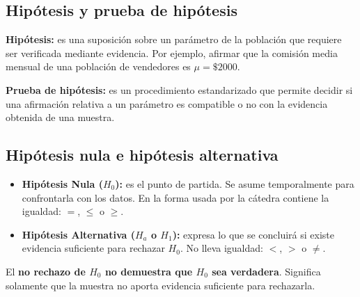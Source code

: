 \documentclass[11pt,a4paper]{article}
\begin{document}
\subsection{Hipótesis y prueba de hipótesis}

\textbf{Hipótesis:} es una suposición sobre un parámetro de la población que requiere ser verificada mediante evidencia. Por ejemplo, afirmar que la comisión media mensual de una población de vendedores es $\mu=\$2000$.

\textbf{Prueba de hipótesis:} es un procedimiento estandarizado que permite decidir si una afirmación relativa a un parámetro es compatible o no con la evidencia obtenida de una muestra.

\begin{center}
\end{center}

\subsection{Hipótesis nula e hipótesis alternativa}

\begin{itemize}
\item \textbf{Hipótesis Nula ($H_0$):} es el punto de partida. Se asume temporalmente para confrontarla con los datos. En la forma usada por la cátedra contiene la igualdad: $=$, $\le$ o $\ge$.
\item \textbf{Hipótesis Alternativa ($H_a$ o $H_1$):} expresa lo que se concluirá si existe evidencia suficiente para rechazar $H_0$. No lleva igualdad: $<$, $>$ o $\neq$.
\end{itemize}

\begin{regla}
El \textbf{no rechazo de $H_0$ no demuestra que $H_0$ sea verdadera}. Significa solamente que la muestra no aporta evidencia suficiente para rechazarla.
\end{regla}
\end{document}
